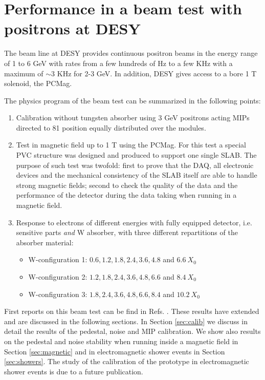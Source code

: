 \documentclass[a4paper,11pt]{article}
\begin{document}
\section{Performance in a beam test with positrons at DESY}
\label{sec:beamtest}


The beam line at DESY provides continuous positron beams in the energy range of 1 to 6 GeV with
rates from a few hundreds of Hz to a few KHz with a maximum of $\sim 3$ KHz for 2-3 GeV. 
In addition, DESY gives access to a bore 1 T solenoid, the PCMag.

The physics program of the beam test can be summarized in the following points:

\begin{enumerate}
\item Calibration without tungsten absorber using 3 GeV positrons acting MIPs directed to 81 position equally distributed over the modules.
\item Test in magnetic field up to 1 T using the PCMag. For this test a special PVC structure was
  designed and produced to support one single SLAB.	
  The purpose of such test was twofold: first to prove that the DAQ, all electronic devices and the 
  mechanical consistency of the SLAB itself are able
  to handle strong magnetic fields; 
  second to check the quality of the data and the performance of the detector during the data taking when running
  in a magnetic field. 
  \item Response to electrons of different energies with fully equipped detector, i.e. sensitive parts {\it and} W absorber, with three different repartitions of the absorber material:
  \begin{itemize}
  \item W-configuration 1: $0.6,1.2,1.8,2.4,3.6,4.8$ and $6.6~X_{0}$
  \item W-configuration 2: $1.2,1.8,2.4,3.6,4.8,6.6$ and $8.4~X_{0}$
  \item W-configuration 3: $1.8,2.4,3.6,4.8,6.6,8.4$ and $10.2~X_{0}$
  \end{itemize}
\end{enumerate}

First reports on this beam test can be find in
Refs. \cite{Irles:2018uum,Irles:2018hcd}. These results have extended and
are discussed in the following sections. In Section \ref{sec:calib} we discuss in detail
the results of the pedestal, noise and MIP calibration.
We show also results on the pedestal and noise stability when running inside
a magnetic field in Section \ref{sec:magnetic} and in electromagnetic shower
events in Section \ref{sec:showers}. The study of the calibration of the prototype
in electromagnetic shower events is due to a future publication.
\end{document}
